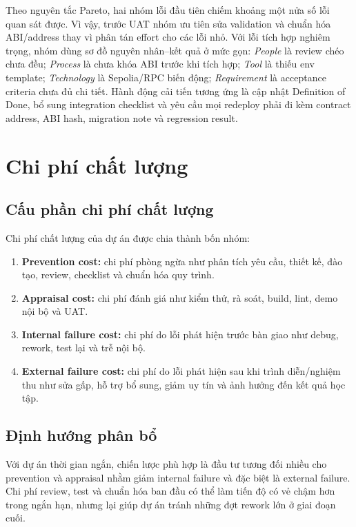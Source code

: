 Theo nguyên tắc Pareto, hai nhóm lỗi đầu tiên chiếm khoảng một nửa số lỗi quan sát được. Vì vậy, trước UAT nhóm ưu tiên sửa validation và chuẩn hóa ABI/address thay vì phân tán effort cho các lỗi nhỏ. Với lỗi tích hợp nghiêm trọng, nhóm dùng sơ đồ nguyên nhân--kết quả ở mức gọn: \textit{People} là review chéo chưa đều; \textit{Process} là chưa khóa ABI trước khi tích hợp; \textit{Tool} là thiếu env template; \textit{Technology} là Sepolia/RPC biến động; \textit{Requirement} là acceptance criteria chưa đủ chi tiết. Hành động cải tiến tương ứng là cập nhật Definition of Done, bổ sung integration checklist và yêu cầu mọi redeploy phải đi kèm contract address, ABI hash, migration note và regression result.

\iffalse
\section{Chi phí chất lượng}

\subsection{Cấu phần chi phí chất lượng}

Chi phí chất lượng của dự án được chia thành bốn nhóm:

\begin{enumerate}
  \item \textbf{Prevention cost:} chi phí phòng ngừa như phân tích yêu cầu, thiết kế, đào tạo, review, checklist và chuẩn hóa quy trình.
  \item \textbf{Appraisal cost:} chi phí đánh giá như kiểm thử, rà soát, build, lint, demo nội bộ và UAT.
  \item \textbf{Internal failure cost:} chi phí do lỗi phát hiện trước bàn giao như debug, rework, test lại và trễ nội bộ.
  \item \textbf{External failure cost:} chi phí do lỗi phát hiện sau khi trình diễn/nghiệm thu như sửa gấp, hỗ trợ bổ sung, giảm uy tín và ảnh hưởng đến kết quả học tập.
\end{enumerate}

\subsection{Định hướng phân bổ}

Với dự án thời gian ngắn, chiến lược phù hợp là đầu tư tương đối nhiều cho prevention và appraisal nhằm giảm internal failure và đặc biệt là external failure. Chi phí review, test và chuẩn hóa ban đầu có thể làm tiến độ có vẻ chậm hơn trong ngắn hạn, nhưng lại giúp dự án tránh những đợt rework lớn ở giai đoạn cuối.


